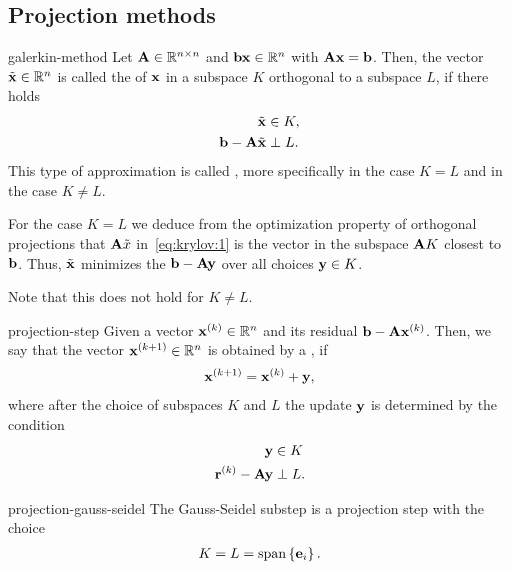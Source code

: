 \subsection{Projection methods}

\begin{Definition}{galerkin-method}
  Let $\mathbf A\in\mathbb R^{n\times n}$ and $\mathbf b\mathbf x\in\mathbb R^n$ with $\mathbf A\mathbf x=\mathbf b$. Then,
  the vector $\tilde{\mathbf x}\in\mathbb R^n$ is called the  of $\mathbf x$ in a subspace $K$ orthogonal to a subspace
  $L$, if there holds
  \begin{align}
    \tilde{\mathbf x} &\in K,\\
    \mathbf b-\mathbf A\tilde{\mathbf x} &\perp L.
                         \label{eq:krylov:1}
  \end{align}
  This type of approximation is called , more
  specifically  in the case $K=L$ and
   in the case $K\neq L$.
\end{Definition}

\begin{remark}
  For the case $K=L$ we deduce from the optimization property of
  orthogonal projections that $\mathbf A\tilde x$ in~\eqref{eq:krylov:1}
  is the vector in the subspace $\mathbf A K$ closest to $\mathbf b$. Thus,
  $\tilde{\mathbf x}$ minimizes the  $\mathbf b-\mathbf A\mathbf y$ over
  all choices $\mathbf y\in K$.

 Note that this does not hold for $K\neq L$.
\end{remark}

\begin{Definition}{projection-step}
  Given a vector $\mathbf x^{(k)}\in\mathbb R^n$ and its residual
  $\mathbf b-\mathbf A\mathbf x^{(k)}$. Then, we say that the vector
  $\mathbf x^{(k+1)}\in\mathbb R^n$ is obtained by a , if
  \begin{gather}
    \mathbf x^{(k+1)} = \mathbf x^{(k)} + \mathbf y,
  \end{gather}
  where after the choice of subspaces $K$ and $L$ the update $\mathbf y$ is
  determined by the condition
  \begin{align}
    \mathbf y&\in K\\
    \mathbf r^{(k)} - \mathbf A\mathbf y &\perp L.
  \end{align}
\end{Definition}

\begin{Example}{projection-gauss-seidel}
  The Gauss-Seidel substep is a projection step with the choice
  \begin{gather}
    K=L=\operatorname{span}\left\{\mathbf e_i\right\}.
  \end{gather}
\end{Example}

